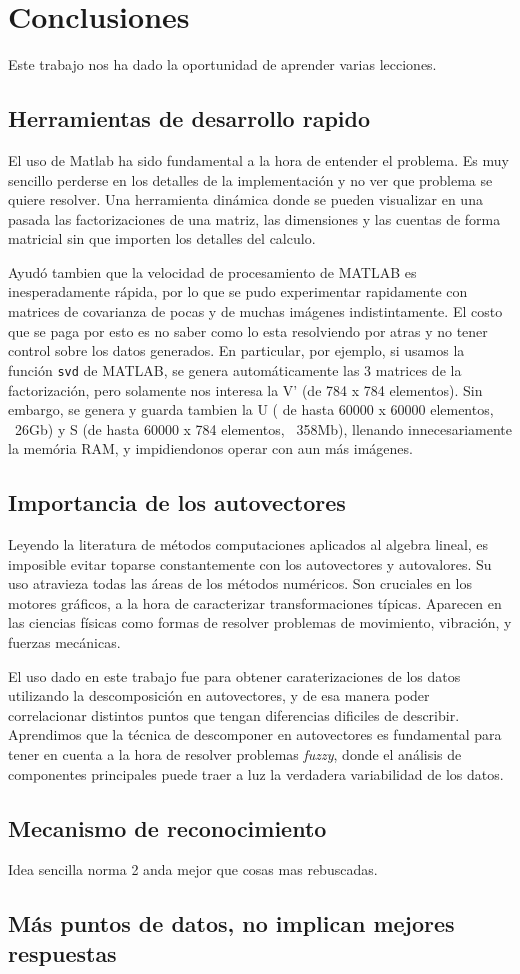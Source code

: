 \section{Conclusiones}

Este trabajo nos ha dado la oportunidad de aprender varias lecciones.

\subsection{Herramientas de desarrollo rapido}

El uso de Matlab ha sido fundamental a la hora de entender el problema.
Es muy sencillo perderse en los detalles de la implementaci\'on y no ver que
problema se quiere resolver. Una herramienta din\'amica donde se pueden visualizar
en una pasada las factorizaciones de una matriz, las dimensiones y las cuentas 
de forma matricial sin que importen los detalles del calculo.

Ayud\'o tambien que la velocidad de procesamiento de MATLAB es inesperadamente
r\'apida, por lo que se pudo experimentar rapidamente con matrices de covarianza
de pocas y de muchas im\'agenes indistintamente. El costo que se paga por esto es
no saber como lo esta resolviendo por atras y no tener control sobre los datos generados.
En particular, por ejemplo, si usamos la funci\'on \texttt{svd} de MATLAB, se genera
autom\'aticamente las 3 matrices de la factorizaci\'on, pero solamente nos interesa
la V' (de 784 x 784 elementos). Sin embargo, se genera y guarda tambien la U ( de hasta
60000 x 60000 elementos, ~26Gb) y S (de hasta 60000 x 784 elementos, ~358Mb), llenando innecesariamente
la mem\'oria RAM, y impidiendonos operar con aun m\'as im\'agenes.


\subsection{Importancia de los autovectores}

Leyendo la literatura de m\'etodos computaciones aplicados al algebra lineal, es
imposible evitar toparse constantemente con los autovectores y autovalores. Su
uso atravieza todas las \'areas de los m\'etodos num\'ericos. Son cruciales
en los motores gr\'aficos, a la hora de caracterizar transformaciones t\'ipicas.
Aparecen en las ciencias f\'isicas como formas de resolver problemas de movimiento,
vibraci\'on, y fuerzas mec\'anicas.

El uso dado en este trabajo fue para obtener caraterizaciones de los datos utilizando la 
descomposici\'on en autovectores, y de esa manera poder correlacionar distintos puntos que
tengan diferencias dificiles de describir. Aprendimos que la t\'ecnica de descomponer en autovectores 
es fundamental para tener en cuenta a la hora de resolver problemas \textit{fuzzy}, donde
el an\'alisis de componentes principales puede traer a luz la verdadera variabilidad de los datos.


\subsection{Mecanismo de reconocimiento}
Idea sencilla norma 2 anda mejor que cosas mas rebuscadas.

\subsection{M\'as puntos de datos, no implican mejores respuestas}
